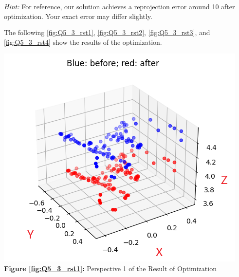 \textit{Hint:} For reference, our solution achieves a reprojection error around 10 after optimization. Your exact error may differ slightly. 

\begin{your_solution}[title=Q5.3,height=21.5cm,width=\linewidth]
The following \autoref{fig:Q5_3_rst1}, \autoref{fig:Q5_3_rst2}, \autoref{fig:Q5_3_rst3}, and \autoref{fig:Q5_3_rst4} show the results of the optimization.
\newline

\begin{minipage}{0.5\linewidth}
	\centering
	\includegraphics[width=1\linewidth, height=1\columnwidth]{../Q5_3_rst1.png}
	\textbf{Figure \ref{fig:Q5_3_rst1}:} Perspective 1 of the Result of Optimization
	\label{fig:Q5_3_rst1}         %
\end{minipage}
\hfill
\begin{minipage}{0.5\linewidth}
	\centering

\end{minipage}
\end{your_solution}
